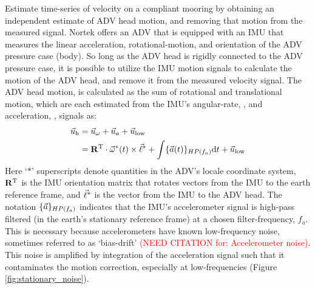 \documentclass[twocol]{ametsoc}
\newcommand{\citeneeded}[1]{\textcolor{red}{(NEED CITATION for: #1)}}
\begin{document}
Estimate time-series of velocity on a compliant mooring by obtaining an independent estimate of ADV head motion, and removing that motion from the measured signal. Nortek offers an ADV that is equipped with an IMU that measures the linear acceleration, rotational-motion, and orientation of the ADV pressure case (body). So long as the ADV head is rigidly connected to the ADV pressure case, it is possible to utilize the IMU motion signals to calculate the motion of the ADV head, and remove it from the measured velocity signal.  The ADV head motion, is calculated as the sum of rotational and translational motion, which are each estimated from the IMU's angular-rate, \AngRt, and acceleration, \Accel, signals as:
\begin{align}
  \vec{u}_\mathrm{h} & = \vec{u}_\omega + \vec{u}_a + \vec{u}_\mathrm{low} \\
      & = \mathbf{R}^\mathrm{T} \cdot \vec{\omega}^*(t)\times\vec{\ell}^* + \int \{{\vec{a}}(t)\}_{HP(f_{a})} \mathrm{d}t + \vec{u}_\mathrm{low}
\end{align}
Here `$*$' superscripts denote quantities in the ADV's locale coordinate system, $\mathbf{R}^\mathrm{T}$ is the IMU orientation matrix that rotates vectors from the IMU to the earth reference frame, and $\vec{\ell}^*$ is the vector from the IMU to the ADV head. The notation $\{{\vec{a}}\}_{HP(f_a)}$ indicates that the IMU's accelerometer signal is high-pass filtered (in the earth's stationary reference frame) at a chosen filter-frequency, $f_a$. This is necessary because accelerometers have known low-frequency noise, sometimes referred to as `bias-drift' \citeneeded{Accelerometer noise}. This noise is amplified by integration of the acceleration signal such that it contaminates the motion correction, especially at low-frequencies (Figure \ref{fig:stationary_noise}).


\end{document}
